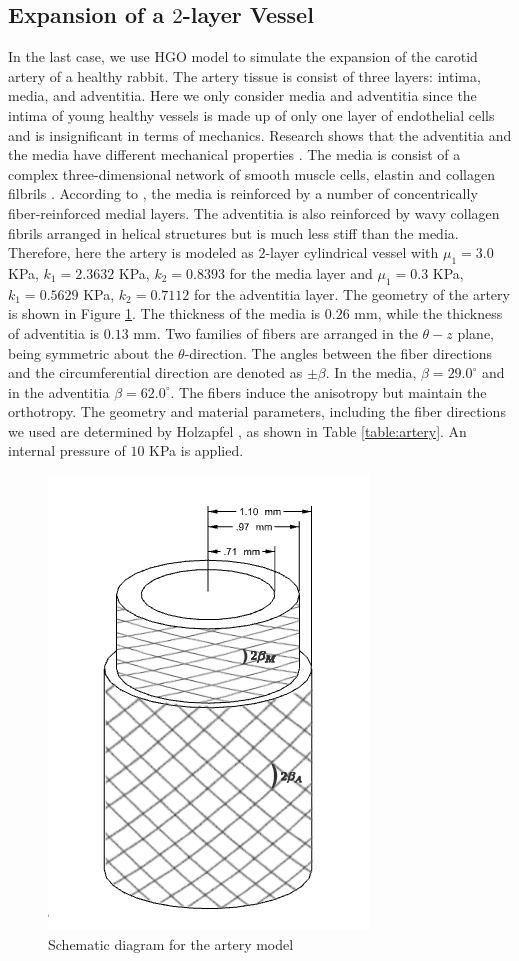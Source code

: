 \subsection{Expansion of a $2$-layer Vessel}
In the last case, we use HGO model to simulate the expansion of the carotid artery of a healthy rabbit. The artery tissue is consist of three layers: intima, media, and adventitia. Here we only consider media and adventitia since the intima of young healthy vessels is made up of only one layer of endothelial cells and is insignificant in terms of mechanics. Research shows that the adventitia and the media have different mechanical properties \cite{Keitzer, Fung3}. The media is consist of a complex three-dimensional network of smooth muscle cells, elastin and collagen filbrils \cite{Holzapfel2}. According to \cite{Rhodin}, the media is reinforced by a number of concentrically fiber-reinforced medial layers. The adventitia is also reinforced by wavy collagen fibrils arranged in helical structures but is much less stiff than the media. Therefore, here the artery is modeled as $2$-layer cylindrical vessel with $\mu_1 = 3.0$ KPa, $k_1 = 2.3632$ KPa, $k_2 = 0.8393$ for the media layer and $\mu_1 = 0.3$ KPa, $k_1 = 0.5629$ KPa, $k_2 = 0.7112$ for the adventitia layer. The geometry of the artery is shown in Figure \ref{fig:vessel_schematic3}. The thickness of the media is $0.26$ mm, while the thickness of adventitia is $0.13$ mm. Two families of fibers are arranged in the $\theta-z$ plane, being symmetric about the $\theta$-direction. The angles between the fiber directions and the circumferential direction are denoted as $\pm\beta$. In the media, $\beta = 29.0^\circ$ and in the adventitia $\beta = 62.0^\circ$. The fibers induce the anisotropy but maintain the orthotropy. The geometry and material parameters, including the fiber directions we used are determined by Holzapfel \cite{Holzapfel2}, as shown in Table \ref{table:artery}. An internal pressure of $10$ KPa is applied. 

\begin{figure}[H]
\centering
\includegraphics[width=.3\textwidth]{./figures/vessel_schematic2.png}
\caption{Schematic diagram for the artery model}
\label{fig:vessel_schematic3}
\end{figure}

